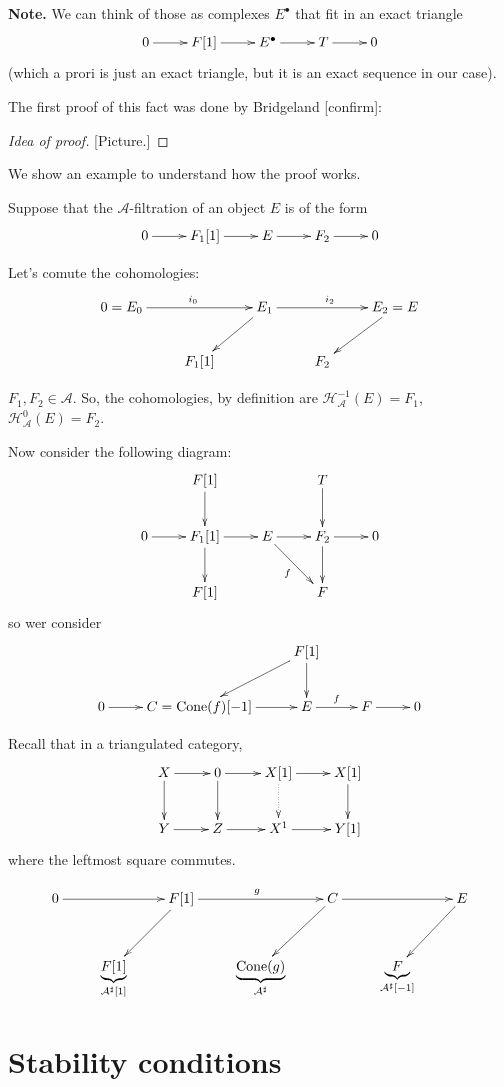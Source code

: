 \noindent
{\bf Note.} We can think of those as
complexes $E ^\bullet$ that fit in an exact triangle
 $$
\xymatrix{
0\ar[r]&F[1]\ar[r]&E^\bullet\ar[r]&T\ar[r]&0
}
$$
(which a prori is just an exact triangle, but it is an exact
sequence in our case).

The first proof of this fact was done by Bridgeland [confirm]:

\begin{proof}[Idea of proof]
[Picture.]
\end{proof}

We show an example to understand how the proof works.

\begin{example}
\label{example-}
Suppose that the $\mathcal{A}$-filtration of an object $E$ is of the form
$$
\xymatrix{
0\ar[r]&F_1[1]\ar[r]&E\ar[r]&F_2\ar[r]&0
}
$$

Let's comute the cohomologies:
$$
\xymatrix{
0=E_0\ar[rr]^{i_0}&&E_1\ar[dl]\ar[rr]^{i_2}&&E_2=E\ar[dl]\\
&F_1[1]&  & F_2
}
$$

$F_1,F_2 \in \mathcal{A}$. So, the cohomologies, by definition are
 $\mathcal{H}_{\mathcal{A}}^{-1}(E)=F_1$,
$\mathcal{H}_{\mathcal{A}}^0(E)=F_2$.
 
Now consider the following diagram:
$$
\xymatrix{
&  F[1]\ar[d]&  &  T\ar[d]\\
0 \ar[r]&  F_1[1]\ar[d]\ar[r]&  E \ar[r]\ar[rd]_f&  F_2\ar[d]\ar[r]& 0\\
& F[1]& & F
}
$$
so wer consider
$$
\xymatrix{
& & F[1]\ar[dl]\ar[d]\\
0\ar[r]&C=\text{Cone}(f)[-1]\ar[r]&E\ar[r]^f&F\ar[r]&0
}
$$
\end{example}

Recall that in a triangulated category,
$$
\xymatrix{
X\ar[d]\ar[r]&  0 \ar[d]\ar[r]& X[1]\ar@{.>}[d]\ar[r]& X[1]\ar[d]\\
Y\ar[r]& Z\ar[r]& X^1\ar[r]&Y[1]
}
$$
where the leftmost square commutes.

$$
\xymatrix{
0\ar[rr]&&F[1]\ar[dl]\ar[rr]^{g}&  &  C \ar[dl]\ar[rr]&  &  E\ar[dl]\\
&  \underbrace{F[1]}_{\mathcal{A}^\sharp[1]}&  &  \underbrace{\text{Cone}(g)}_{\mathcal{A}^\sharp}& &
\underbrace{F}_{\mathcal{A}^\sharp[-1]}
}
$$

\section{Stability conditions}
\label{section-stability-conditions}

